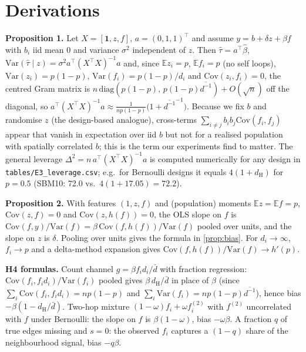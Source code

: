 \documentclass{article}
\theoremstyle{plain}
\theoremstyle{remark}
\newcommand{\E}{\mathbb{E}}
\newcommand{\Var}{\mathrm{Var}}
\newcommand{\dH}{d_{\mathrm H}}
\begin{document}
\section{Derivations}\label{app:deriv}
\textbf{Proposition 1.} Let $X=[\mathbf1,z,f]$, $a=(0,1,1)^\top$ and assume $y=b+\delta z+\beta f$ with $b_i$ iid mean 0 and variance $\sigma^2$ independent of $z$. Then $\hat\tau=a^\top\hat\beta$, $\Var(\hat\tau\mid z)=\sigma^2a^\top(X^\top X)^{-1}a$ and, since $\E z_i=p$, $\E f_i=p$ (no self loops), $\Var(z_i)=p(1-p)$, $\Var(f_i)=p(1-p)/d_i$ and $\mathrm{Cov}(z_i,f_i)=0$, the centred Gram matrix is $n\,\mathrm{diag}(p(1-p),\,p(1-p)\overline{d^{-1}})+O(\sqrt n)$ off the diagonal, so $a^\top(X^\top X)^{-1}a\approx\frac{1}{np(1-p)}\big(1+\overline{d^{-1}}^{-1}\big)$. Because we fix $b$ and randomise $z$ (the design-based analogue), cross-terms $\sum_{i\ne j}b_ib_j\mathrm{Cov}(f_i,f_j)$ appear that vanish in expectation over iid $b$ but not for a realised population with spatially correlated $b$; this is the term our experiments find to matter. The general leverage $\Delta^2=n\,a^\top(X^\top X)^{-1}a$ is computed numerically for any design in \texttt{tables/E3\_leverage.csv}; e.g.\ for Bernoulli designs it equals $4(1+\dH)$ for $p=0.5$ (SBM10: 72.0 vs.\ $4(1+17.05)=72.2$).

\textbf{Proposition 2.} With features $(1,z,f)$ and (population) moments $\E z=\E f=p$, $\mathrm{Cov}(z,f)=0$ and $\mathrm{Cov}(z,h(f))=0$, the OLS slope on $f$ is $\mathrm{Cov}(f,y)/\Var(f)=\beta\,\mathrm{Cov}(f,h(f))/\Var(f)$ pooled over units, and the slope on $z$ is $\delta$. Pooling over units gives the formula in \cref{prop:bias}. For $d_i\to\infty$, $f_i\to p$ and a delta-method expansion gives $\mathrm{Cov}(f,h(f))/\Var(f)\to h'(p)$.

\textbf{H4 formulas.} Count channel $g=\beta f_id_i/\bar d$ with fraction regression: $\mathrm{Cov}(f_i,f_id_i)/\Var(f_i)$ pooled gives $\beta\,\dH/\bar d$ in place of $\beta$ (since $\sum_i\mathrm{Cov}(f_i,f_id_i)=np(1-p)$ and $\sum_i\Var(f_i)=np(1-p)\overline{d^{-1}}$), hence bias $-\beta(1-\dH/\bar d)$. Two-hop mixture $(1-\omega)f_i+\omega f^{(2)}_i$ with $f^{(2)}$ uncorrelated with $f$ under Bernoulli: the slope on $f$ is $\beta(1-\omega)$, bias $-\omega\beta$. A fraction $q$ of true edges missing and $s=0$: the observed $f_i$ captures a $(1-q)$ share of the neighbourhood signal, bias $-q\beta$.
\end{document}
